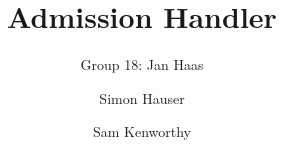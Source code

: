 \documentclass[runningheads]{llncs}
\begin{document}
%
\title{Admission Handler}

\author{Group 18: Jan Haas \and Simon Hauser \and Sam Kenworthy}

\institute{}
%
\maketitle              %






\end{document}
